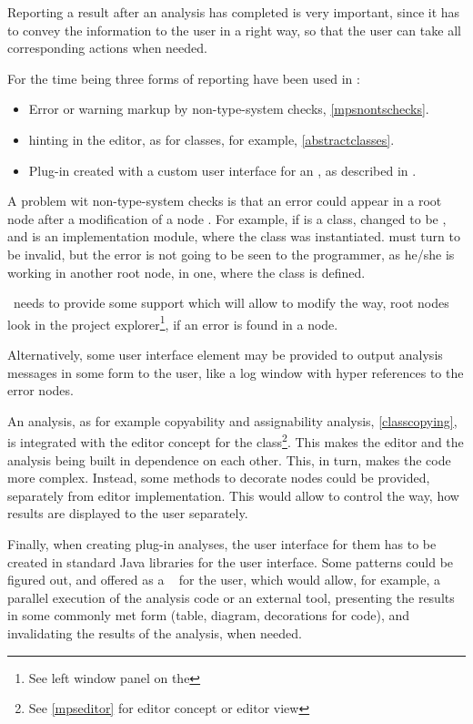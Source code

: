 Reporting a result after an analysis has completed is very important, since it has to convey the 
information to the user in a right way, so that the user can take all corresponding actions when needed.

For the time being three forms of reporting have been used in \jbmps:

\begin{itemize}
 \item Error or warning markup by non-type-system checks, \ref{mpsnontschecks}.
 \item {} hinting in the editor, as for  classes, for example, \ref{abstractclasses}.
 \item Plug-in created with a custom user interface for an , as described in \cite{2012_ratiu_modular_dsls_and_analyses}.
\end{itemize}

A problem wit non-type-system checks is that an error could appear in a root node  after a modification of a node . For example, if  is a class,
changed to be , and  is an implementation module, where the class  was instantiated.  must turn to be invalid, but the error
is not going to be seen to the programmer, as he/she is working in another root node, in one, where the  class is defined.

\jbmps\ needs to provide some support which will allow to modify the way, root nodes look in the project explorer\footnote{See left window panel on the },
if an error is found in a node.

Alternatively, some user interface element may be provided to output analysis messages in some form to the user, like a log window with hyper references to the error nodes.

An  analysis, as for example copyability and assignability analysis, \ref{classcopying}, is integrated with the editor concept for the 
class\footnote{See \ref{mpseditor} for editor concept or editor view}. This makes the editor and the analysis being built in dependence on each other.
This, in turn, makes the code more complex. Instead, some methods to decorate nodes could be provided, separately from editor implementation. This 
would allow to control the way, how  results are displayed to the user separately.

Finally, when creating plug-in analyses, the user interface for them has to be created in standard Java libraries for the user interface. Some patterns 
could be figured out, and offered as a \jbmps\  for the user, which would allow, for example, a parallel execution of the analysis code or an external tool,
presenting the results in some commonly met form (table, diagram, decorations for code), and invalidating the results of the analysis, when needed.

